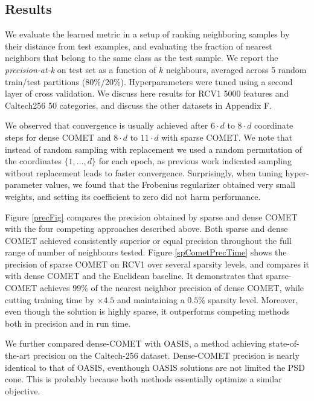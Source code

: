 \documentclass[twoside,11pt]{article}
\newcommand{\ignore}[1]{}
\begin{document}
\subsection{Results}\vskip -5pt
We evaluate the learned metric in a setup of ranking neighboring samples by their distance from test examples, and evaluating the fraction of nearest neighbors that belong to the same class as the test sample. We report the \textit{precision-at-k} on test set as a function of $k$ neighbours, averaged across 5 random train/test partitions (80\%/20\%). Hyperparameters were tuned using a second layer of cross validation. We discuss here results for RCV1 5000 features and Caltech256 50 categories, and discuss the other datasets in Appendix F.
\ignore{Figure \ref{cometConvergeFig} shows the \textit{precision-at-k} over the test sets as it progresses during learning. 
}
We observed that convergence is usually achieved after $6 \cdot d$ to $8 \cdot d$ coordinate steps for dense COMET and $8 \cdot d$ to $11 \cdot d$ with sparse COMET. We note that instead of random sampling with replacement we used a random permutation of the coordinates $\{1, \ldots, d\}$ for each epoch, as previous work indicated sampling without replacement leads to faster convergence.
Surprisingly, when tuning hyper-parameter values, we found that the Frobenius regularizer obtained very small weights, and setting its coefficient to zero did not harm performance. 

Figure \ref{precFig} compares the precision obtained by sparse and dense COMET with the four competing approaches described above. Both sparse and dense COMET achieved consistently superior or equal precision throughout the full range of number of neighbours tested.
Figure \ref{spCometPrecTime} shows the precision of sparse COMET on RCV1 over several sparsity levels, and compares it with dense COMET and the Euclidean baseline. It demonstrates that sparse-COMET achieves $99\%$ of the nearest neighbor precision of dense COMET, while cutting training time by $\times4.5$ and maintaining a $0.5\%$ sparsity level. Moreover, even though the solution is highly sparse, it outperforms competing methods both in precision and in run time.

We further compared dense-COMET with OASIS, a method achieving state-of-the-art precision on the Caltech-256 dataset. Dense-COMET precision is nearly identical to that of OASIS, eventhough OASIS solutions are not limited the PSD cone. This is probably because both methods essentially optimize a similar objective.
\end{document}
